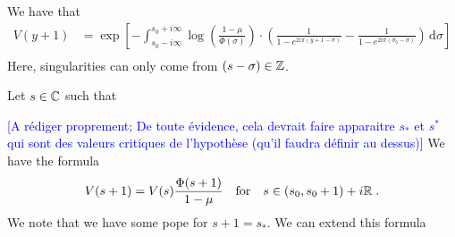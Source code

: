 \documentclass[11pt]{amsart}
\newcommand{\diff}{\,\mathrm{d}}
\newcommand{\ndr}[1]{\textcolor{blue}{[#1]}}
\begin{document}
We have that 
\begin{align*}
    V(y+1) 
    &= 
    \exp \left[
        - \int_{s_0-i\infty}^{s_0+i\infty}\log \left( \frac{1-\mu}{\Phi(\sigma)}\right)
        \cdot \left(
            \frac{1}{1-e^{2i\pi(y+1-\sigma)}} - \frac{1}{1-e^{2i\pi(\sigma_0-\sigma)}}
         \right) \diff \sigma \right]  \\
\end{align*}
Here, singularities can only come from $(s-\sigma) \in \mathbb{Z}$. 

 Let $s \in \mathbb{C}$ such that

\ndr{A rédiger proprement; De toute évidence, cela devrait faire apparaitre $s_*$ et $s^*$ qui sont des valeurs critiques de l'hypothèse (qu'il faudra définir au dessus)}
 We have the formula 
 \begin{equation}
     V(s+1) = V(s)\frac{\Phi(s+1)}{1-\mu}
     \quad \text{for} \quad
     s \in (s_0, s_0+1) + i\mathbb{R}
     \; .
 \end{equation}
 We note that we have some pope for $s+1 = s_*$.
 We can extend this formula 
 





\end{document}
